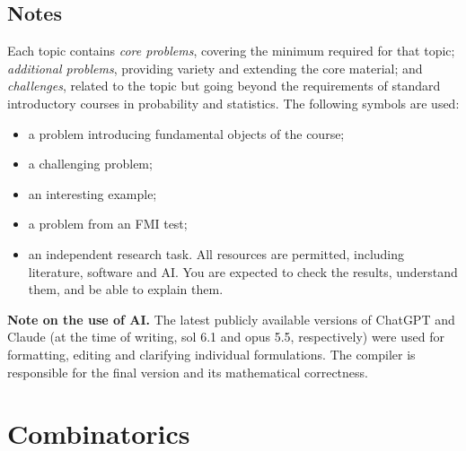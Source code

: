 \documentclass[11pt,a4paper]{article}
\newcounter{problem}[section]
\begin{document}
\setcounter{tocdepth}{1}
\tableofcontents
{}\par\smallskip

\subsection*{Notes}
Each topic contains \emph{core problems}, covering the minimum required for that topic;
\emph{additional problems}, providing variety and extending the core material; and
\emph{challenges}, related to the topic but going beyond the requirements of standard
introductory courses in probability and statistics.
The following symbols are used:
\begin{itemize}
  \item[\faBook] a problem introducing fundamental objects of the course;
  \item[\faStar] a challenging problem;
  \item[\faSmile] an interesting example;
  \item[\faPencil*] a problem from an FMI test;
  \item[\faRobot] an independent research task. All resources are permitted, including
  literature, software and AI. You are expected to check the results, understand them,
  and be able to explain them.
\end{itemize}
{\small
\textbf{Note on the use of AI.}
The latest publicly available versions of ChatGPT and Claude (at the time of writing,
sol 6.1 and opus 5.5, respectively) were used for formatting, editing and clarifying
individual formulations. The compiler is responsible for the final version and its
mathematical correctness.
}
\section{Combinatorics}
\end{document}

